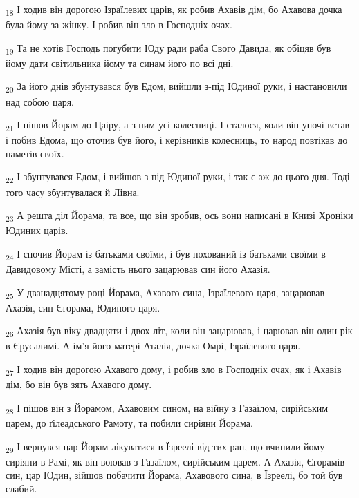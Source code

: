 \begin{tcolorbox}
\textsubscript{18} І ходив він дорогою Ізраїлевих царів, як робив Ахавів дім, бо Ахавова дочка була йому за жінку. І робив він зло в Господніх очах.
\end{tcolorbox}
\begin{tcolorbox}
\textsubscript{19} Та не хотів Господь погубити Юду ради раба Свого Давида, як обіцяв був йому дати світильника йому та синам його по всі дні.
\end{tcolorbox}
\begin{tcolorbox}
\textsubscript{20} За його днів збунтувався був Едом, вийшли з-під Юдиної руки, і настановили над собою царя.
\end{tcolorbox}
\begin{tcolorbox}
\textsubscript{21} І пішов Йорам до Цаіру, а з ним усі колесниці. І сталося, коли він уночі встав і побив Едома, що оточив був його, і керівників колесниць, то народ повтікав до наметів своїх.
\end{tcolorbox}
\begin{tcolorbox}
\textsubscript{22} І збунтувався Едом, і вийшов з-під Юдиної руки, і так є аж до цього дня. Тоді того часу збунтувалася й Лівна.
\end{tcolorbox}
\begin{tcolorbox}
\textsubscript{23} А решта діл Йорама, та все, що він зробив, ось вони написані в Книзі Хроніки Юдиних царів.
\end{tcolorbox}
\begin{tcolorbox}
\textsubscript{24} І спочив Йорам із батьками своїми, і був похований із батьками своїми в Давидовому Місті, а замість нього зацарював син його Ахазія.
\end{tcolorbox}
\begin{tcolorbox}
\textsubscript{25} У дванадцятому році Йорама, Ахавого сина, Ізраїлевого царя, зацарював Ахазія, син Єгорама, Юдиного царя.
\end{tcolorbox}
\begin{tcolorbox}
\textsubscript{26} Ахазія був віку двадцяти і двох літ, коли він зацарював, і царював він один рік в Єрусалимі. А ім'я його матері Аталія, дочка Омрі, Ізраїлевого царя.
\end{tcolorbox}
\begin{tcolorbox}
\textsubscript{27} І ходив він дорогою Ахавого дому, і робив зло в Господніх очах, як і Ахавів дім, бо він був зять Ахавого дому.
\end{tcolorbox}
\begin{tcolorbox}
\textsubscript{28} І пішов він з Йорамом, Ахавовим сином, на війну з Газаїлом, сирійським царем, до ґілеадського Рамоту, та побили сиріяни Йорама.
\end{tcolorbox}
\begin{tcolorbox}
\textsubscript{29} І вернувся цар Йорам лікуватися в Їзреелі від тих ран, що вчинили йому сиріяни в Рамі, як він воював з Газаїлом, сирійським царем. А Ахазія, Єгорамів син, цар Юдин, зійшов побачити Йорама, Ахавового сина, в Їзреелі, бо той був слабий.
\end{tcolorbox}
